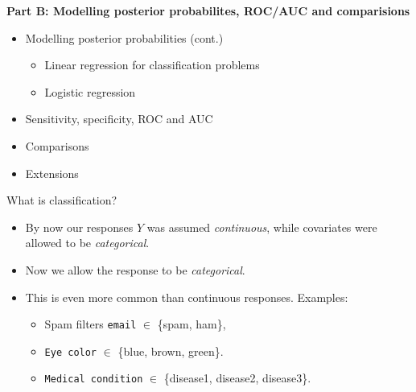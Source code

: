 \documentclass[10pt,ignorenonframetext,]{beamer}
\providecommand{\tightlist}{%
  \setlength{\itemsep}{0pt}\setlength{\parskip}{0pt}}
\begin{document}
\begin{frame}

\textbf{Part B: Modelling posterior probabilites, ROC/AUC and
comparisions }

\begin{itemize}
\tightlist
\item
  Modelling posterior probabilities (cont.)

  \begin{itemize}
  \tightlist
  \item
    Linear regression for classification problems
  \item
    Logistic regression
  \end{itemize}
\item
  Sensitivity, specificity, ROC and AUC
\item
  Comparisons
\item
  Extensions
\end{itemize}

\end{frame}

\begin{frame}

\end{frame}

\begin{frame}[fragile]{What is classification?}

\vspace{2mm}

\begin{itemize}
\item
  By now our responses \(Y\) was assumed \emph{continuous}, while
  covariates were allowed to be \emph{categorical}.
\item
  Now we allow the response to be \emph{categorical}.
\item
  This is even more common than continuous responses. Examples:

  \begin{itemize}
  \tightlist
  \item
    Spam filters \texttt{email} \(\in\) \{spam, ham\},
  \item
    \texttt{Eye\ color} \(\in\) \{blue, brown, green\}.
  \item
    \texttt{Medical\ condition} \(\in\) \{disease1, disease2,
    disease3\}.
  \end{itemize}
\end{itemize}

\end{frame}
\end{document}
